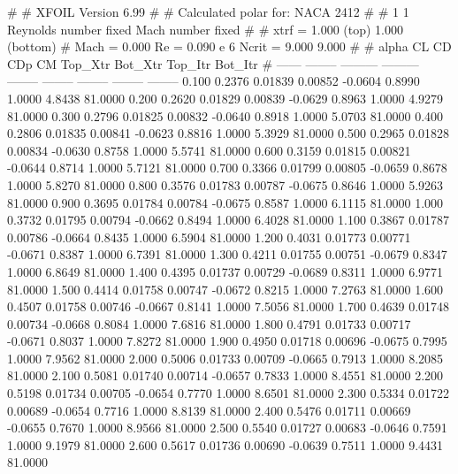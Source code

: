 #  
#       XFOIL         Version 6.99
#  
# Calculated polar for: NACA 2412                                       
#  
# 1 1 Reynolds number fixed          Mach number fixed         
#  
# xtrf =   1.000 (top)        1.000 (bottom)  
# Mach =   0.000     Re =     0.090 e 6     Ncrit =   9.000  9.000
#  
#   alpha    CL        CD       CDp       CM     Top_Xtr  Bot_Xtr  Top_Itr  Bot_Itr
#  ------ -------- --------- --------- -------- -------- -------- -------- --------
   0.100   0.2376   0.01839   0.00852  -0.0604   0.8990   1.0000   4.8438  81.0000
   0.200   0.2620   0.01829   0.00839  -0.0629   0.8963   1.0000   4.9279  81.0000
   0.300   0.2796   0.01825   0.00832  -0.0640   0.8918   1.0000   5.0703  81.0000
   0.400   0.2806   0.01835   0.00841  -0.0623   0.8816   1.0000   5.3929  81.0000
   0.500   0.2965   0.01828   0.00834  -0.0630   0.8758   1.0000   5.5741  81.0000
   0.600   0.3159   0.01815   0.00821  -0.0644   0.8714   1.0000   5.7121  81.0000
   0.700   0.3366   0.01799   0.00805  -0.0659   0.8678   1.0000   5.8270  81.0000
   0.800   0.3576   0.01783   0.00787  -0.0675   0.8646   1.0000   5.9263  81.0000
   0.900   0.3695   0.01784   0.00784  -0.0675   0.8587   1.0000   6.1115  81.0000
   1.000   0.3732   0.01795   0.00794  -0.0662   0.8494   1.0000   6.4028  81.0000
   1.100   0.3867   0.01787   0.00786  -0.0664   0.8435   1.0000   6.5904  81.0000
   1.200   0.4031   0.01773   0.00771  -0.0671   0.8387   1.0000   6.7391  81.0000
   1.300   0.4211   0.01755   0.00751  -0.0679   0.8347   1.0000   6.8649  81.0000
   1.400   0.4395   0.01737   0.00729  -0.0689   0.8311   1.0000   6.9771  81.0000
   1.500   0.4414   0.01758   0.00747  -0.0672   0.8215   1.0000   7.2763  81.0000
   1.600   0.4507   0.01758   0.00746  -0.0667   0.8141   1.0000   7.5056  81.0000
   1.700   0.4639   0.01748   0.00734  -0.0668   0.8084   1.0000   7.6816  81.0000
   1.800   0.4791   0.01733   0.00717  -0.0671   0.8037   1.0000   7.8272  81.0000
   1.900   0.4950   0.01718   0.00696  -0.0675   0.7995   1.0000   7.9562  81.0000
   2.000   0.5006   0.01733   0.00709  -0.0665   0.7913   1.0000   8.2085  81.0000
   2.100   0.5081   0.01740   0.00714  -0.0657   0.7833   1.0000   8.4551  81.0000
   2.200   0.5198   0.01734   0.00705  -0.0654   0.7770   1.0000   8.6501  81.0000
   2.300   0.5334   0.01722   0.00689  -0.0654   0.7716   1.0000   8.8139  81.0000
   2.400   0.5476   0.01711   0.00669  -0.0655   0.7670   1.0000   8.9566  81.0000
   2.500   0.5540   0.01727   0.00683  -0.0646   0.7591   1.0000   9.1979  81.0000
   2.600   0.5617   0.01736   0.00690  -0.0639   0.7511   1.0000   9.4431  81.0000
